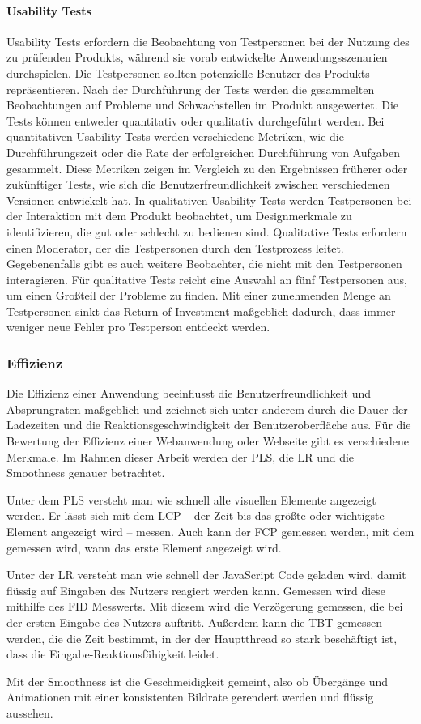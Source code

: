 \paragraph{Usability Tests}
Usability Tests erfordern die Beobachtung von Testpersonen bei der Nutzung des zu prüfenden Produkts, während sie vorab entwickelte Anwendungsszenarien durchspielen. Die Testpersonen sollten potenzielle Benutzer des Produkts repräsentieren.\cite[S.~22]{Dumas.1999} Nach der Durchführung der Tests werden die gesammelten Beobachtungen auf Probleme und Schwachstellen im Produkt ausgewertet. Die Tests können entweder quantitativ oder qualitativ durchgeführt werden. Bei quantitativen Usability Tests werden verschiedene Metriken, wie die Durchführungszeit oder die Rate der erfolgreichen Durchführung von Aufgaben gesammelt. Diese Metriken zeigen im Vergleich zu den Ergebnissen früherer oder zukünftiger Tests, wie sich die Benutzerfreundlichkeit zwischen verschiedenen Versionen entwickelt hat. In qualitativen Usability Tests werden Testpersonen bei der Interaktion mit dem Produkt beobachtet, um Designmerkmale zu identifizieren, die gut oder schlecht zu bedienen sind.\cite{Budiu.2017} Qualitative Tests erfordern einen Moderator, der die Testpersonen durch den Testprozess leitet. Gegebenenfalls gibt es auch weitere Beobachter, die nicht mit den Testpersonen interagieren.\cite{Moran.2019} Für qualitative Tests reicht eine Auswahl an fünf Testpersonen aus, um einen Großteil der Probleme zu finden. Mit einer zunehmenden Menge an Testpersonen sinkt das Return of Investment maßgeblich dadurch, dass immer weniger neue Fehler pro Testperson entdeckt werden.\cite{Nielsen.2012}

\subsubsection{Effizienz}\label{sec:PerformanceBasics}
Die Effizienz einer Anwendung beeinflusst die Benutzerfreundlichkeit und Absprungraten maßgeblich und zeichnet sich unter anderem durch die Dauer der Ladezeiten und die Reaktionsgeschwindigkeit der Benutzeroberfläche aus. Für die Bewertung der Effizienz einer Webanwendung oder Webseite gibt es verschiedene Merkmale. Im Rahmen dieser Arbeit werden der \ac{PLS}, die \ac{LR} und die Smoothness genauer betrachtet. 

Unter dem \ac{PLS} versteht man wie schnell alle visuellen Elemente angezeigt werden. Er lässt sich mit dem \ac{LCP} – der Zeit bis das größte oder wichtigste Element angezeigt wird – messen. Auch kann der \ac{FCP} gemessen werden, mit dem gemessen wird, wann das erste Element angezeigt wird.

Unter der \ac{LR} versteht man wie schnell der JavaScript Code geladen wird, damit flüssig auf Eingaben des Nutzers reagiert werden kann. Gemessen wird diese mithilfe des \ac{FID} Messwerts. Mit diesem wird die Verzögerung gemessen, die bei der ersten Eingabe des Nutzers auftritt. Außerdem kann die \ac{TBT} gemessen werden, die die Zeit bestimmt, in der der Hauptthread so stark beschäftigt ist, dass die Eingabe-Reaktionsfähigkeit leidet.

Mit der Smoothness ist die Geschmeidigkeit gemeint, also ob Übergänge und Animationen mit einer konsistenten Bildrate gerendert werden und flüssig aussehen.
